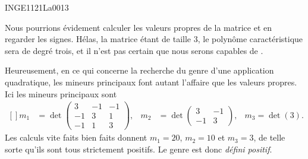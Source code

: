 

\begin{corrige}{INGE1121La0013}

	Nous pourrions évidement calculer les valeurs propres de la matrice et en regarder les signes. Hélas, la matrice étant de taille $3$, le polynôme caractéristique sera de degré trois, et il n'est pas certain que nous serons capables de .

	Heureusement, en ce qui concerne la recherche du genre d'une application quadratique, les mineurs principaux font autant l'affaire que les valeurs propres. Ici les mineurs principaux sont
	\begin{equation}
		\begin{aligned}[]
			m_1&=\det\begin{pmatrix}
				3	&	-1	&	-1	\\
				-1	&	3	&	1	\\
				-1	&	1	&	3
			\end{pmatrix},
			&m_2&=\det\begin{pmatrix}
				3	&	-1	\\ 
				-1	&	3	
			\end{pmatrix},
			&m_3=\det(3).
		\end{aligned}
	\end{equation}
	Les calculs vite faits bien faits donnent $m_1=20$, $m_2=10$ et $m_3=3$, de telle sorte qu'ils sont tous strictement positifs. Le genre est donc \emph{défini positif}.

\end{corrige}
